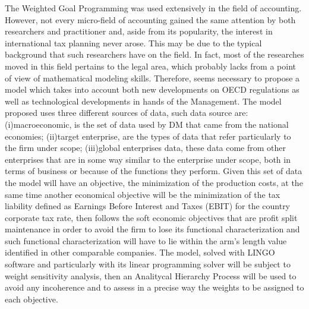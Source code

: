 \documentclass{article}
\begin{document}
The Weighted Goal Programming was used extensively in the field of accounting\cite{aouni_goal_2017}. However, not every micro-field of accounting gained the same attention by both researchers and practitioner and, aside from its popularity, the interest in international tax planning never arose\cite{merville_transfer_1978}. This may be due to the typical background that such researchers have on the field. In fact, most of the researches moved in this field pertains to the legal area, which probably lacks from a point of view of mathematical modeling skills.
Therefore, seems necessary to propose a model which takes into account both new developments on OECD regulations as well as technological developments in hands of the Management.
The model proposed uses three different sources of data, such data source are: (i)macroeconomic, is the set of data used by DM that came from the national economies; (ii)target enterprise, are the types of data that refer particularly to the firm under scope; (iii)global enterprises data, these data come from other enterprises that are in some way similar to the enterprise under scope, both in terms of business or because of the functions they perform.
Given this set of data the model will have an objective, the minimization of the production costs, at the same time another economical objective will be the minimization of the tax liability defined as Earnings Before Interest and Taxes (EBIT) for the country corporate tax rate, then follows the soft economic objectives that are profit split maintenance in order to avoid the firm to lose its functional characterization and such functional characterization will have to lie within the arm's length value identified in other comparable companies.
The model, solved with LINGO software and particularly with its linear programming solver will be subject to weight sensitivity analysis, then an Analitycal Hierarchy Process\cite{Saaty1980} will be used to avoid any incoherence and to assess in a precise way the weights to be assigned to each objective.
\pagebreak
\printbibliography
\end{document}
